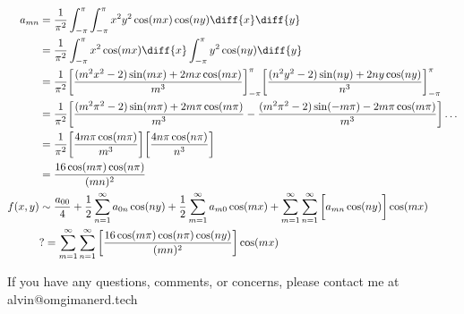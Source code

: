 \documentclass{math}
\begin{document}
\begin{align*}
  a_{mn} &= \frac{1}{\pi^2}\int_{-\pi}^{\pi}\int_{-\pi}^{\pi}x^2y^2
    \cos(mx)\cos(ny)\diff{x}\diff{y} \\
  &= \frac{1}{\pi^2}\int_{-\pi}^{\pi}x^2\cos(mx)\diff{x}
    \int_{-\pi}^{\pi}y^2\cos(ny)\diff{y} \\
  &= \frac{1}{\pi^2}
    \bigg[\frac{(m^2x^2-2)\sin(mx)+2mx\cos(mx)}{m^3}\bigg]_{-\pi}^{\pi}
    \bigg[\frac{(n^2y^2-2)\sin(ny)+2ny\cos(ny)}{n^3}\bigg]_{-\pi}^{\pi} \\
  &= \frac{1}{\pi^2}
    \bigg[
      \frac{(m^2\pi^2-2)\sin(m\pi)+2m\pi\cos(m\pi)}{m^3}-
      \frac{(m^2\pi^2-2)\sin(-m\pi)-2m\pi\cos(m\pi)}{m^3}
    \bigg]\dots \\
  &= \frac{1}{\pi^2}
    \bigg[\frac{4m\pi\cos(m\pi)}{m^3}\bigg]
    \bigg[\frac{4n\pi\cos(n\pi)}{n^3}\bigg] \\
  &= \frac{16\cos(m\pi)\cos(n\pi)}{(mn)^2} \\
  f(x,y) &\sim \frac{a_{00}}{4}+\frac{1}{2}\sum_{n=1}^{\infty}a_{0n}\cos(ny)+
    \frac{1}{2}\sum_{m=1}^{\infty}a_{m0}\cos(mx)+
    \sum_{m=1}^{\infty}\sum_{n=1}^{\infty}\bigg[a_{mn}\cos(ny)\bigg]\cos(mx) \\
  &?= \sum_{m=1}^{\infty}\sum_{n=1}^{\infty}\bigg[
    \frac{16\cos(m\pi)\cos(n\pi)\cos(ny)}{(mn)^2}\bigg]\cos(mx)
\end{align*}

\begin{center}
  If you have any questions, comments, or concerns, please contact me at
  alvin@omgimanerd.tech
\end{center}
\end{document}
